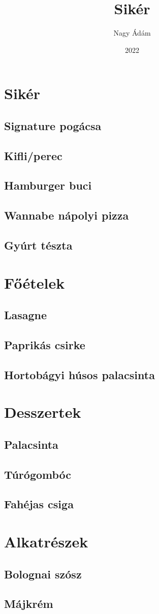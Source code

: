 \documentclass[10pt, a5paper]{book}
\title{Sikér}
\author{Nagy Ádám}
\date{2022}
\begin{document}
\maketitle

\chapter{Sikér}
\section{Signature pogácsa}
\section{Kifli/perec}
\section{Hamburger buci}
\section{Wannabe nápolyi pizza}
\section{Gyúrt tészta}



\chapter{Főételek}
\section{Lasagne}
\section{Paprikás csirke}
\section{Hortobágyi húsos palacsinta}

\chapter{Desszertek}
\section{Palacsinta}
\section{Túrógombóc}
\section{Fahéjas csiga}


\chapter{Alkatrészek}
\section{Bolognai szósz}
\section{Májkrém}
\end{document}
